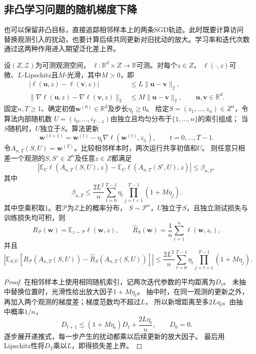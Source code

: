 \subsection{非凸学习问题的随机梯度下降}

也可以保留非凸目标，直接追踪相邻样本上的两条SGD轨迹。此时既要计算访问替换观测引入的扰动，也要计算后续共同更新对旧扰动的放大。学习率和迭代次数通过这两种作用进入期望泛化差上界。

\begin{theorem}[非凸SGD的扰动传播]
\label{thm:nonconvex-sgd-product}
设$(Z,\mathcal Z)$为可测观测空间，
$\ell:\mathbb R^d\times Z\to\mathbb R$可测。对每个$z\in Z$，
$\ell(\cdot,z)$可微、$L$-Lipschitz且$M$-光滑，其中$M>0$，即
\[
\begin{aligned}
 |\ell(\bm u,z)-\ell(\bm v,z)|
 &\leq L\|\bm u-\bm v\|_2,\\
 \|\nabla\ell(\bm u,z)-\nabla\ell(\bm v,z)\|_2
 &\leq M\|\bm u-\bm v\|_2,
 \qquad \bm u,\bm v\in\mathbb R^d.
\end{aligned}
\]
固定$n,T\geq1$、确定初值$\bm w^{(0)}\in\mathbb R^d$及步长$\eta_t\geq0$。
给定$S=(z_1,\ldots,z_n)\in Z^n$，令算法内部随机数
$U=(i_0,\ldots,i_{T-1})$由独立且均匀分布于$\{1,\ldots,n\}$的索引组成；
当$S$随机时，$U$独立于$S$。算法更新
\[
 \bm w^{(t+1)}
 =\bm w^{(t)}-\eta_t\nabla\ell(\bm w^{(t)},z_{i_t}),
 \qquad t=0,\ldots,T-1.
\]
令$A_{n,T}(S,U)=\bm w^{(T)}$。比较相邻样本时，两次运行共享初值和$U$。
则任意只相差一个观测的$S,S'\in Z^n$及任意$z\in Z$都满足
\[
 \left|\mathbb E_U\ell(A_{n,T}(S,U),z)
 -\mathbb E_U\ell(A_{n,T}(S',U),z)\right|\leq\beta_{n,T},
\]
其中
\[
 \beta_{n,T}\leq\frac{2L^2}{n}
 \sum_{t=0}^{T-1}\eta_t\prod_{j=t+1}^{T-1}(1+M\eta_j).
\]
其中空乘积取1。若$\mathcal P$为$Z$上的概率分布，
$S\sim\mathcal P^n$，$U$独立于$S$，且独立测试损失与训练损失均可积，则
\[
 R_{\mathcal P}(\bm w)=\mathbb E_{z\sim\mathcal P}\ell(\bm w,z),
 \qquad
 \hat R_S(\bm w)=\frac1n\sum_{i=1}^n\ell(\bm w,z_i),
\]
并且
\[
 \left|\mathbb E_{S,U}
 [R_{\mathcal P}(A_{n,T}(S,U))-\hat R_S(A_{n,T}(S,U))]\right|
 \leq\frac{2L^2}{n}
 \sum_{t=0}^{T-1}\eta_t\prod_{j=t+1}^{T-1}(1+M\eta_j).
\]
\end{theorem}
\begin{proof}
在相邻样本上使用相同随机索引，记两次迭代参数的平均距离为$D_t$。
未抽中替换位置时，光滑性给出放大因子$1+M\eta_t$。
抽中时，在同一观测的更新之外，再加入两个观测的梯度差；梯度范数均不超过$L$，
所以新增距离至多$2L\eta_t$。由抽中概率$1/n$，
\[
 D_{t+1}\leq(1+M\eta_t)D_t+\frac{2L\eta_t}{n},\qquad D_0=0.
\]
逐步展开递推式，每一步产生的扰动都乘以后续更新的放大因子。
最后用Lipschitz性将$D_T$乘以$L$，即得损失差上界。
\end{proof}

